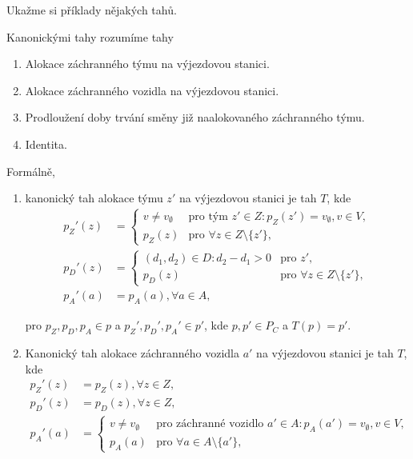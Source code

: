 Ukažme si příklady nějakých tahů.

\begin{definice}
  Kanonickými tahy rozumíme tahy
  \begin{enumerate}
    \item
      Alokace záchranného týmu na výjezdovou stanici.

    \item
      Alokace záchranného vozidla na výjezdovou stanici.

    \item
      Prodloužení doby trvání směny již naalokovaného záchranného týmu. 

    \item
      Identita.
  \end{enumerate}

  Formálně,
  \begin{enumerate}
    \item
      kanonický tah alokace týmu $z'$ na výjezdovou stanici je tah $T$, kde
      \begin{align*}
        p_Z'(z) &=
          \begin{cases}
            v \neq v_{\emptyset} & \text{pro tým $z' \in Z \colon p_Z(z') = v_{\emptyset}, v \in V$}, \\
            p_Z(z) & \text{pro $\forall z \in Z \setminus \{ z' \}$},
          \end{cases}
          \\
        p_D'(z) &=
          \begin{cases}
            (d_1, d_2) \in D \colon d_2 - d_1 > 0 & \text{pro $z'$}, \\
            p_D(z) & \text{pro $\forall z \in Z \setminus \{ z' \}$},
          \end{cases}
          \\
        p_A'(a) &= p_A(a), \forall a \in A,
      \end{align*}

      pro $p_Z, p_D, p_A \in p$ a $p_Z', p_D', p_A' \in p'$, kde $p, p' \in P_C$ a $T(p) = p'$.

    \item
      Kanonický tah alokace záchranného vozidla $a'$ na výjezdovou stanici je tah $T$, kde
      \begin{align*}
        p_Z'(z) &= p_Z(z), \forall z \in Z,
        \\
        p_D'(z) &= p_D(z), \forall z \in Z,
        \\
        p_A'(a) &=
        \begin{cases}
          v \neq v_{\emptyset} & \text{pro záchranné vozidlo $a' \in A \colon p_A(a') = v_{\emptyset}, v \in V$}, \\
          p_A(a) & \text{pro $\forall a \in A \setminus \{ a' \}$},
        \end{cases}
      \end{align*}


\end{enumerate}
\end{definice}
